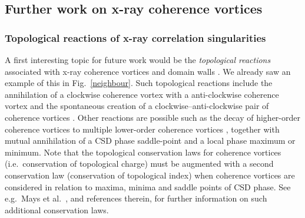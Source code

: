 \documentclass[%
 reprint,
 amsmath,amssymb,
 aps,
]{revtex4-1}
\begin{document}



\subsection{Further work on x-ray coherence vortices}\label{subsec:Discussion-part-3}

\subsubsection{Topological reactions of x-ray correlation singularities} A first interesting topic for future work would be the {\em topological reactions} associated with x-ray coherence vortices and domain walls  \cite{GburSPIE,TopologicalReactionsCohVortices,Marasinghe2010}.  We already saw an example of this in Fig.~\ref{neighbour}.  Such topological reactions include the annihilation of a clockwise coherence vortex with a anti-clockwise coherence vortex and the spontaneous creation of a clockwise--anti-clockwise pair of coherence vortices \cite{TopologicalReactionsCohVortices}.  Other reactions are possible such as the decay of higher-order coherence vortices to multiple lower-order coherence vortices \cite{TopologicalReactionsCohVortices}, together with mutual annihilation of a CSD phase saddle-point and a local phase maximum or minimum.  Note that the topological conservation laws for coherence vortices (i.e.~conservation of topological charge) must be augmented with a second conservation law (conservation of topological index) when coherence vortices are considered in relation to maxima, minima and saddle points of CSD phase.  See e.g.~Mays et al.~\cite{MaysPonsaingPaganin2018}, and references therein, for further information on such additional conservation laws. 
\end{document}
